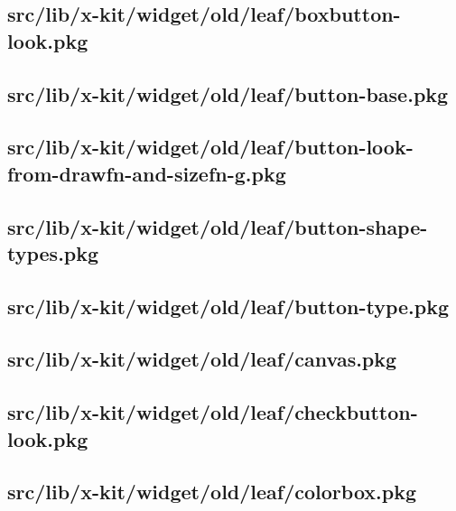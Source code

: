 \subsection{src/lib/x-kit/widget/old/leaf/boxbutton-look.pkg}


\subsection{src/lib/x-kit/widget/old/leaf/button-base.pkg}


\subsection{src/lib/x-kit/widget/old/leaf/button-look-from-drawfn-and-sizefn-g.pkg}


\subsection{src/lib/x-kit/widget/old/leaf/button-shape-types.pkg}


\subsection{src/lib/x-kit/widget/old/leaf/button-type.pkg}


\subsection{src/lib/x-kit/widget/old/leaf/canvas.pkg}


\subsection{src/lib/x-kit/widget/old/leaf/checkbutton-look.pkg}


\subsection{src/lib/x-kit/widget/old/leaf/colorbox.pkg}


